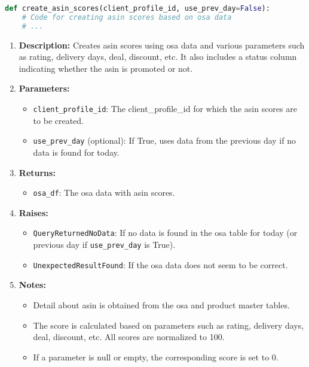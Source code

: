 \begin{lstlisting}[language=Python]
def create_asin_scores(client_profile_id, use_prev_day=False):
    # Code for creating asin scores based on osa data
    # ...

\end{lstlisting}
\begin{enumerate}
    \item \textbf{Description:} Creates asin scores using osa data and various parameters such as rating, delivery days, deal, discount, etc. It also includes a status column indicating whether the asin is promoted or not.
    \item \textbf{Parameters:}
          \begin{itemize}
              \item \texttt{client\_profile\_id}: The client\_profile\_id for which the asin scores are to be created.
              \item \texttt{use\_prev\_day} (optional): If True, uses data from the previous day if no data is found for today.
          \end{itemize}
    \item \textbf{Returns:}
          \begin{itemize}
              \item \texttt{osa\_df}: The osa data with asin scores.
          \end{itemize}
    \item \textbf{Raises:}
          \begin{itemize}
              \item \texttt{QueryReturnedNoData}: If no data is found in the osa table for today (or previous day if \texttt{use\_prev\_day} is True).
              \item \texttt{UnexpectedResultFound}: If the osa data does not seem to be correct.
          \end{itemize}
    \item \textbf{Notes:}
          \begin{itemize}
              \item Detail about asin is obtained from the osa and product master tables.
              \item The score is calculated based on parameters such as rating, delivery days, deal, discount, etc. All scores are normalized to 100.
              \item If a parameter is null or empty, the corresponding score is set to 0.
          \end{itemize}
\end{enumerate}

